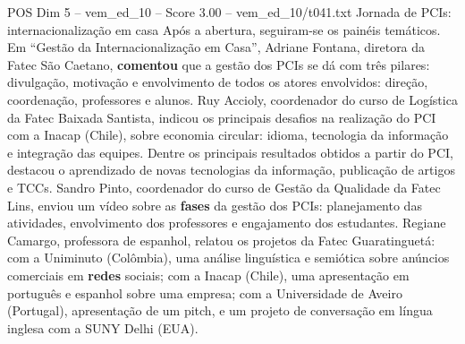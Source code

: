 \begin{textsample}{POS Dim 5 – vem\_ed\_10 – Score 3.00 – vem\_ed\_10/t041.txt}  \label{ex:f5_pos_125}
Jornada de PCIs: internacionalização em casa Após a abertura, seguiram-se os painéis temáticos.
Em “Gestão da Internacionalização em Casa”, Adriane Fontana, diretora da Fatec São Caetano, \textbf{comentou} que a gestão dos PCIs se dá com três pilares: divulgação, motivação e envolvimento de todos os atores envolvidos: direção, coordenação, professores e alunos.
Ruy Accioly, coordenador do curso de Logística da Fatec Baixada Santista, indicou os principais desafios na realização do PCI com a Inacap (Chile), sobre economia circular: idioma, tecnologia da informação e integração das equipes.
Dentre os principais resultados obtidos a partir do PCI, destacou o aprendizado de novas tecnologias da informação, publicação de artigos e TCCs.
Sandro Pinto, coordenador do curso de Gestão da Qualidade da Fatec Lins, enviou um vídeo sobre as \textbf{fases} da gestão dos PCIs: planejamento das atividades, envolvimento dos professores e engajamento dos estudantes.
Regiane Camargo, professora de espanhol, relatou os projetos da Fatec Guaratinguetá: com a Uniminuto (Colômbia), uma análise linguística e semiótica sobre anúncios comerciais em \textbf{redes} sociais; com a Inacap (Chile), uma apresentação em português e espanhol sobre uma empresa; com a Universidade de Aveiro (Portugal), apresentação de um pitch, e um projeto de conversação em língua inglesa com a SUNY Delhi (EUA).

\end{textsample}

